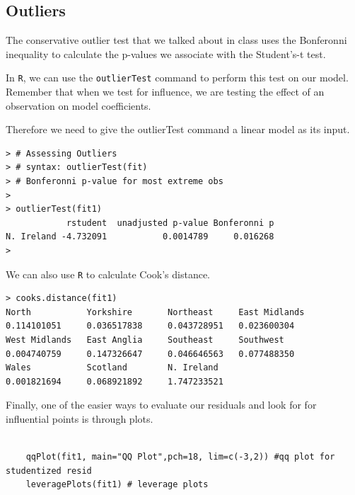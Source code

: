 \documentclass[residuals.tex]{subfiles}
\begin{document}
\newpage
\subsection*{Outliers}




The conservative outlier test that we talked about in class uses the
Bonferonni inequality to calculate the p-values we associate with the
Student's-t test. 

In \texttt{R}, we can use the \texttt{outlierTest} command to perform this
test on our model. Remember that when we test for influence, we are testing
the effect of an observation on model coefficients. 

Therefore we need to
give the outlierTest command a linear model as its input.
\begin{framed}
	\begin{verbatim}
> # Assessing Outliers
> # syntax: outlierTest(fit) 
> # Bonferonni p-value for most extreme obs
>
> outlierTest(fit1)
            rstudent  unadjusted p-value Bonferonni p
N. Ireland -4.732091           0.0014789     0.016268
> 
\end{verbatim}
\end{framed}
\noindent We can also use \texttt{R} to calculate Cook's distance. 
\begin{framed}
\begin{verbatim}
> cooks.distance(fit1)
North           Yorkshire       Northeast     East Midlands 
0.114101051     0.036517838     0.043728951   0.023600304 
West Midlands   East Anglia     Southeast     Southwest 
0.004740759     0.147326647     0.046646563   0.077488350 
Wales           Scotland        N. Ireland 
0.001821694     0.068921892     1.747233521 
\end{verbatim}
\end{framed}

Finally, one of the easier ways to evaluate our residuals and look for
for influential points is through plots. 

\begin{framed}
	\begin{verbatim}
	
	qqPlot(fit1, main="QQ Plot",pch=18, lim=c(-3,2)) #qq plot for studentized resid 
	leveragePlots(fit1) # leverage plots
	\end{verbatim}
\end{framed}
\end{document}
